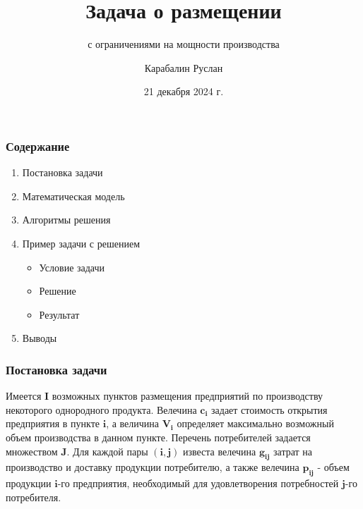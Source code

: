 \documentclass[12pt]{beamer}
\title{Задача о размещении}
\subtitle{с ограничениями на мощности производства}
\author{Карабалин Руслан}
\date{21 декабря 2024 г.}
\begin{document}
	
	\begin{frame}
		\titlepage
	\end{frame}

    \begin{frame}
        \frametitle{Содержание}

        \vspace{-2cm}

        \begin{enumerate}
            \item Постановка задачи
            \item Математическая модель
            \item Алгоритмы решения
            \item Пример задачи с решением
            \begin{itemize}
                \item Условие задачи
                \item Решение
                \item Результат
            \end{itemize}
            \item Выводы
        \end{enumerate}

    \end{frame}

    \begin{frame}
        \frametitle{Постановка задачи}

        Имеется $\boldsymbol{I}$ возможных пунктов размещения предприятий
        по производству некоторого однородного продукта.
        Велечина $\boldsymbol{c_{i}}$ задает стоимость открытия предприятия
        в пункте $\boldsymbol{i}$, а величина $\boldsymbol{V_{i}}$ определяет максимально
        возможный объем производства в данном пункте.
        Перечень потребителей задается множеством $\boldsymbol{J}$.
        Для каждой пары $\boldsymbol{(i, j)}$ известа велечина $\boldsymbol{g_{ij}}$
        затрат на производство и доставку продукции потребителю,
        а также велечина $\boldsymbol{p_{ij}}$ - объем продукции $\boldsymbol{i}$-го предприятия,
        необходимый для удовлетворения потребностей
        $\boldsymbol{j}$-го потребителя.
        
    \end{frame}
\end{document}
